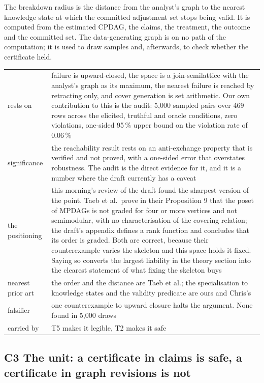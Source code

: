The breakdown radius is the distance from the analyst's graph to the nearest knowledge state at
which the committed adjustment set stops being valid. It is computed from the estimated CPDAG, the
claims, the treatment, the outcome and the committed set. The data-generating graph is on no path
of the computation; it is used to draw samples and, afterwards, to check whether the certificate
held.

\begin{center}\footnotesize
\begin{tabular}{@{}p{2.6cm}p{13.75cm}@{}}
\toprule
rests on & failure is upward-closed, the space is a join-semilattice with the analyst's graph as
its maximum, the nearest failure is reached by retracting only, and cover generation is set
arithmetic. Our own contribution to this is the audit: 5{,}000 sampled pairs over 469 rows across
the elicited, truthful and oracle conditions, zero violations, one-sided 95\,\% upper bound on the
violation rate of 0.06\,\% \\
significance & the reachability result rests on an anti-exchange property that is verified and not
proved, with a one-sided error that overstates robustness. The audit is the direct evidence for it,
and it is a number where the draft currently has a caveat \\
the positioning & this morning's review of the draft found the sharpest version of the point.
Taeb et al.\ prove in their Proposition 9 that the poset of MPDAGs is not graded for four or more
vertices and not semimodular, with no characterisation of the covering relation; the draft's
appendix defines a rank function and concludes that its order is graded. Both are correct, because
their counterexample varies the skeleton and this space holds it fixed. Saying so converts the
largest liability in the theory section into the clearest statement of what fixing the skeleton
buys \\
nearest prior art & the order and the distance are Taeb et al.; the specialisation to knowledge
states and the validity predicate are ours and Chris's \\
falsifier & one counterexample to upward closure halts the argument. None found in 5{,}000 draws \\
carried by & T5 makes it legible, T2 makes it safe \\
\bottomrule
\end{tabular}
\end{center}

\subsection*{C3 \quad The unit: a certificate in claims is safe, a certificate in graph revisions is not}

